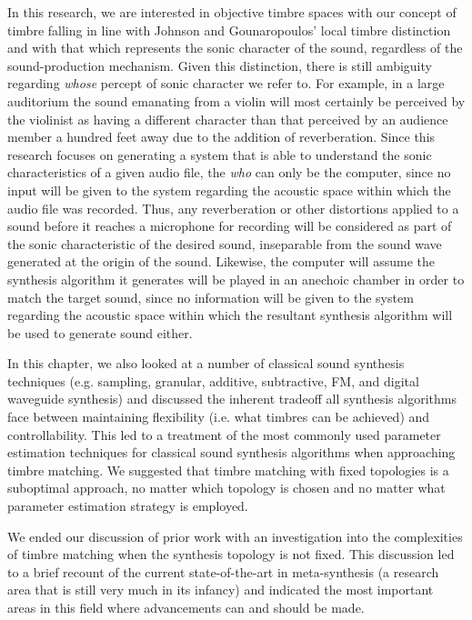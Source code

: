 \documentclass[12pt]{report} 	%
\numberwithin{figure}{chapter}
\numberwithin{table}{chapter}
\numberwithin{equation}{chapter}
\begin{document}
\begin{flushleft}
In this research, we are interested in objective timbre spaces with our concept of timbre falling in line with Johnson and Gounaropoulos' local timbre distinction and with that which represents the sonic character of the sound, regardless of the sound-production mechanism. Given this distinction, there is still ambiguity regarding \textit{whose} percept of sonic character we refer to. For example, in a large auditorium the sound emanating from a violin will most certainly be perceived by the violinist as having a different character than that perceived by an audience member a hundred feet away due to the addition of reverberation. Since this research focuses on generating a system  that is able to understand the sonic characteristics of a given audio file, the \textit{who} can only be the computer, since no input will be given to the system regarding the acoustic space within which the audio file was recorded. Thus, any reverberation or other distortions applied to a sound before it reaches a microphone for recording will be considered as part of the sonic characteristic of the desired sound, inseparable from the sound wave generated at the origin of the sound. Likewise, the computer will assume the synthesis algorithm it generates will be played in an anechoic chamber in order to match the target sound, since no information will be given to the system regarding the acoustic space within which the resultant synthesis algorithm will be used to generate sound either.

In this chapter, we also looked at a number of classical sound synthesis techniques (e.g. sampling, granular, additive, subtractive, FM, and digital waveguide synthesis) and discussed the inherent tradeoff all synthesis algorithms face between maintaining flexibility (i.e. what timbres can be achieved) and controllability. This led to a treatment of the most commonly used parameter estimation techniques for classical sound synthesis algorithms when approaching timbre matching. We suggested that timbre matching with fixed topologies is a suboptimal approach, no matter which topology is chosen and no matter what parameter estimation strategy is employed.

We ended our discussion of prior work with an investigation into the complexities of timbre matching when the synthesis topology is not fixed. This discussion led to a brief recount of the current state-of-the-art in meta-synthesis (a research area that is still very much in its infancy) and indicated the most important areas in this field where advancements can and should be made.


\end{flushleft}
\end{document}
